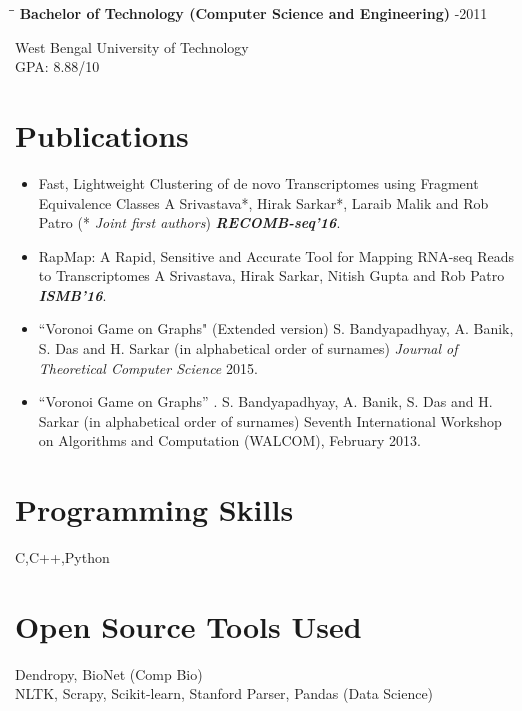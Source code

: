 \documentclass{res}
\begin{document}
\begin{resume}
\vspace{-0.1in}	
\begin{tabbing}
\hspace{2.3in}\= \hspace{2.6in}\= \kill %
{\bf Bachelor of Technology (Computer Science and Engineering)}  \>     -2011
\end{tabbing}  \vspace{-20pt}      %
West Bengal University of Technology     \\       
GPA: 8.88/10      \\   



\section{Publications}
\begin{itemize}
\item{\color{blue}Fast, Lightweight Clustering of de novo Transcriptomes using Fragment Equivalence Classes} A Srivastava*, Hirak Sarkar*, Laraib Malik and Rob Patro (* \textit{Joint first authors}) \textit{\textbf{RECOMB-seq'16}}.
\item{\color{blue}RapMap: A Rapid, Sensitive and Accurate Tool for Mapping RNA-seq Reads to Transcriptomes} A Srivastava, Hirak Sarkar, Nitish Gupta and Rob Patro  \textit{\textbf{ISMB'16}}.
\item {\color{blue}``Voronoi Game on Graphs"} (Extended version) S. Bandyapadhyay, A. Banik, S. Das and H. Sarkar (in alphabetical order of surnames) {\it Journal of Theoretical Computer Science} 2015.
\item {\color{blue}``Voronoi Game on Graphs''} .  S. Bandyapadhyay, A. Banik, S. Das and H. Sarkar (in alphabetical order of surnames) Seventh International Workshop on Algorithms and Computation (WALCOM), February 2013.
\end{itemize}

\section{Programming Skills}
C,C++,Python

\section{\bf Open Source Tools Used}
Dendropy, BioNet  (Comp Bio) \\
NLTK, Scrapy, Scikit-learn, Stanford Parser, Pandas (Data Science) \\




\end{resume}
\end{document}
